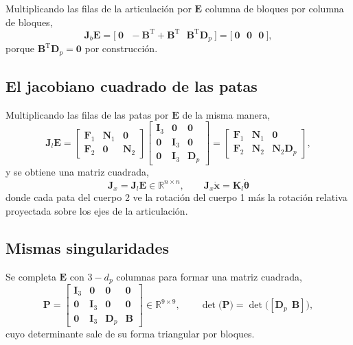 \documentclass[11pt]{article}
\newcommand{\T}{^{\mathrm{T}}}
\newcommand{\Fmat}{\mathbf{F}}
\newcommand{\Nmat}{\mathbf{N}}
\newcommand{\xd}{\dot{\mathbf{x}}}
\newcommand{\thv}{\boldsymbol{\theta}}
\begin{document}
Multiplicando las filas de la articulación por $\mathbf{E}$ columna de bloques por columna de bloques,
\begin{equation}
\mathbf{J}_b\mathbf{E}
=\big[\ \mathbf{0}\ \ \ -\mathbf{B}\T+\mathbf{B}\T\ \ \ \mathbf{B}\T\mathbf{D}_p\ \big]
=\big[\ \mathbf{0}\ \ \ \mathbf{0}\ \ \ \mathbf{0}\ \big],
\label{eq:JbE}
\end{equation}
porque $\mathbf{B}\T\mathbf{D}_p=\mathbf{0}$ por construcción.

\subsection{El jacobiano cuadrado de las patas}

Multiplicando las filas de las patas por $\mathbf{E}$ de la misma manera,
\begin{equation}
\mathbf{J}_l\mathbf{E}=
\begin{bmatrix}
\Fmat_1 & \Nmat_1 & \mathbf{0}\\
\Fmat_2 & \mathbf{0} & \Nmat_2
\end{bmatrix}
\begin{bmatrix}
\mathbf{I}_3 & \mathbf{0} & \mathbf{0}\\
\mathbf{0} & \mathbf{I}_3 & \mathbf{0}\\
\mathbf{0} & \mathbf{I}_3 & \mathbf{D}_p
\end{bmatrix}
=
\begin{bmatrix}
\Fmat_1 & \Nmat_1 & \mathbf{0}\\
\Fmat_2 & \Nmat_2 & \Nmat_2\mathbf{D}_p
\end{bmatrix},
\label{eq:JlE}
\end{equation}
y se obtiene una matriz cuadrada,
\begin{equation}
\boxed{\ \mathbf{J}_x=\mathbf{J}_l\mathbf{E}\in\mathbb{R}^{n\times n},
\qquad
\mathbf{J}_x\xd=\mathbf{K}_l\dot{\thv}\ }
\label{eq:Jx}
\end{equation}
donde cada pata del cuerpo 2 ve la rotación del cuerpo 1 más la rotación relativa proyectada sobre los ejes de la articulación.

\subsection{Mismas singularidades}

Se completa $\mathbf{E}$ con $3-d_p$ columnas para formar una matriz cuadrada,
\begin{equation}
\mathbf{P}=\begin{bmatrix}
\mathbf{I}_3 & \mathbf{0} & \mathbf{0} & \mathbf{0}\\
\mathbf{0} & \mathbf{I}_3 & \mathbf{0} & \mathbf{0}\\
\mathbf{0} & \mathbf{I}_3 & \mathbf{D}_p & \mathbf{B}
\end{bmatrix}\in\mathbb{R}^{9\times9},
\qquad
\det\!\big(\mathbf{P}\big)=\det\!\big([\mathbf{D}_p\ \ \mathbf{B}]\big),
\label{eq:P}
\end{equation}
cuyo determinante sale de su forma triangular por bloques.
\end{document}
